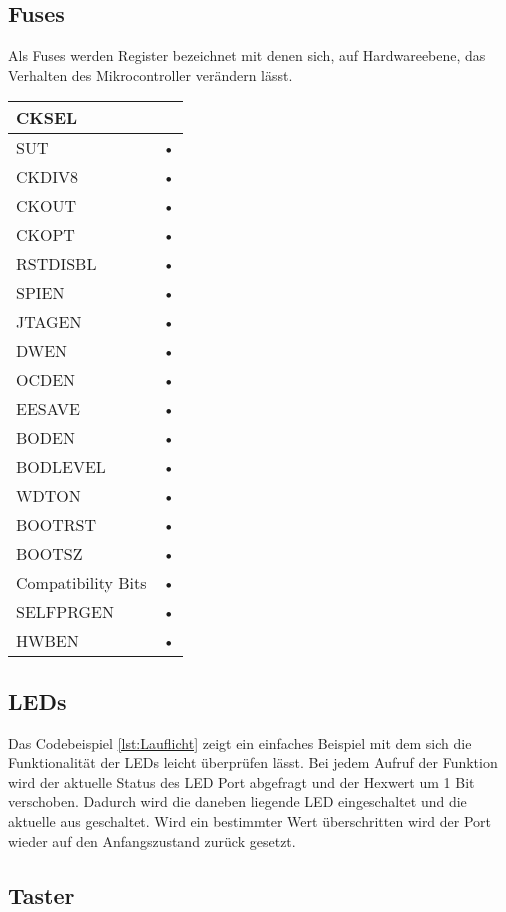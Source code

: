 \subsection{Fuses}
Als Fuses werden Register bezeichnet mit denen sich, auf Hardwareebene, das Verhalten des Mikrocontroller verändern lässt. 
\begin{tabular}{|l|l|}\hline 
CKSEL &  \\ \hline 
SUT & • \\ \hline 
CKDIV8 & • \\ \hline 
CKOUT & • \\ \hline 
CKOPT & • \\ \hline 
RSTDISBL & • \\ \hline 
SPIEN & • \\ \hline 
JTAGEN & • \\ \hline 
DWEN & • \\ \hline 
OCDEN & • \\ \hline 
EESAVE & • \\ \hline 
BODEN & • \\ \hline 
BODLEVEL & • \\ \hline 
WDTON & • \\ \hline 
BOOTRST & • \\ \hline 
BOOTSZ & • \\ \hline 
Compatibility Bits & • \\ \hline 
SELFPRGEN & • \\ \hline 
HWBEN & • \\ \hline 
\end{tabular} 



\subsection{LEDs}
Das Codebeispiel \ref{lst:Lauflicht} zeigt ein einfaches Beispiel mit dem sich die Funktionalität der LEDs leicht überprüfen lässt. Bei jedem Aufruf der Funktion wird der aktuelle Status des LED Port abgefragt und der Hexwert um 1 Bit verschoben. Dadurch wird die daneben liegende LED eingeschaltet und die aktuelle aus geschaltet. Wird ein bestimmter Wert überschritten wird der Port wieder auf den Anfangszustand zurück gesetzt.
\lstset{language=Java, basicstyle=\footnotesize, showstringspaces=false, tabsize=2}

\subsection{Taster}
\lstset{language=Java, basicstyle=\footnotesize, showstringspaces=false, tabsize=2}



